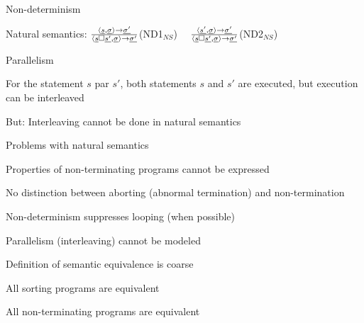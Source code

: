 	\enumend
	\item Non-determinism
	\enumstart
		\item Natural semantics: $\frac{\langle \underline{s}, \underline{\sigma} \rangle \rightarrow \underline{\sigma'}}{\langle \underline{s} \square \underline{s'}, \underline{\sigma} \rangle \rightarrow \underline{\sigma'}}$(ND1$_{NS}$) $\ \ \ $ $\frac{\langle \underline{s'}, \underline{\sigma} \rangle \rightarrow \underline{\sigma'}}{\langle \underline{s} \square \underline{s'}, \underline{\sigma} \rangle \rightarrow \underline{\sigma'}}$(ND2$_{NS}$)
	\enumend
	\item Parallelism
	\enumstart
		\item For the statement $s$ par $s'$, both statements $s$ and $s'$ are executed, but execution can be interleaved
		\item But: Interleaving cannot be done in natural semantics
	\enumend
	\item Problems with natural semantics
	\enumstart
		\item Properties of non-terminating programs cannot be expressed
		\item No distinction between aborting (abnormal termination) and non-termination
		\item Non-determinism suppresses looping (when possible)
		\item Parallelism (interleaving) cannot be modeled
		\item Definition of semantic equivalence is coarse
		\enumstart
			\item All sorting programs are equivalent
			\item All non-terminating programs are equivalent
		\enumend
	\enumend
\enumend
